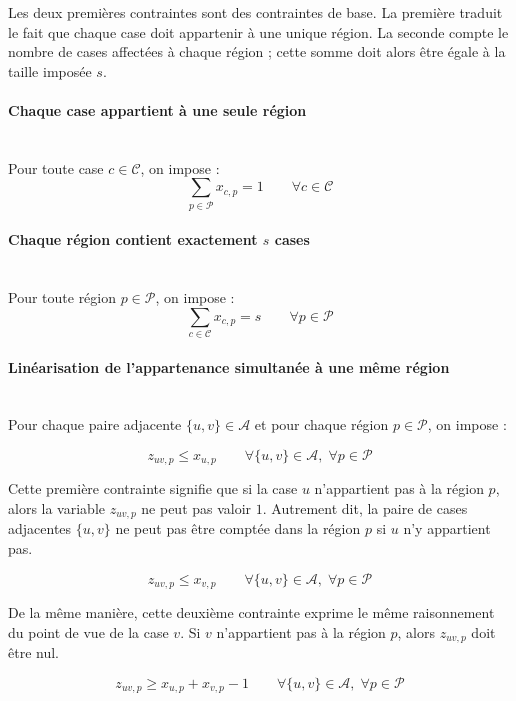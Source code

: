Les deux premières contraintes sont des contraintes de base. La première traduit le fait que chaque case doit appartenir à une unique région. La seconde compte le nombre de cases affectées à chaque région ; cette somme doit alors être égale à la taille imposée \(s\).

\paragraph{Chaque case appartient à une seule région}
\mbox{}\\

Pour toute case \(c \in \mathcal{C}\), on impose :
\[
\sum_{p \in \mathcal{P}} x_{c,p} = 1
\qquad \forall c \in \mathcal{C}
\]

\paragraph{Chaque région contient exactement \(s\) cases}
\mbox{}\\

Pour toute région \(p \in \mathcal{P}\), on impose :
\[
\sum_{c \in \mathcal{C}} x_{c,p} = s
\qquad \forall p \in \mathcal{P}
\]

\paragraph{Linéarisation de l'appartenance simultanée à une même région}
\mbox{}\\

Pour chaque paire adjacente \(\{u,v\} \in \mathcal{A}\) et pour chaque région \(p \in \mathcal{P}\), on impose :

\[
z_{uv,p} \leq x_{u,p}
\qquad \forall \{u,v\} \in \mathcal{A},\; \forall p \in \mathcal{P}
\]

Cette première contrainte signifie que si la case \(u\) n'appartient pas à la région \(p\), alors la variable \(z_{uv,p}\) ne peut pas valoir \(1\). Autrement dit, la paire de cases adjacentes \(\{u,v\}\) ne peut pas être comptée dans la région \(p\) si \(u\) n'y appartient pas.

\[
z_{uv,p} \leq x_{v,p}
\qquad \forall \{u,v\} \in \mathcal{A},\; \forall p \in \mathcal{P}
\]

De la même manière, cette deuxième contrainte exprime le même raisonnement du point de vue de la case \(v\). Si \(v\) n'appartient pas à la région \(p\), alors \(z_{uv,p}\) doit être nul.

\[
z_{uv,p} \geq x_{u,p} + x_{v,p} - 1
\qquad \forall \{u,v\} \in \mathcal{A},\; \forall p \in \mathcal{P}
\]

